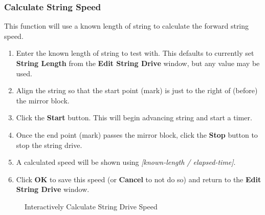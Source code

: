 \documentclass[10pt,letterpaper,titlepage]{article}
\begin{document}
    \subsubsection{Calculate String Speed}
    This function will use a known length of string to calculate the forward string speed.
    \begin{enumerate}
        \item Enter the known length of string to test with. This defaults to currently set \textbf{String Length} from the \textbf{Edit String Drive} window, but any value may be used.
        \item Align the string so that the start point (mark) is just to the right of (before) the mirror block.
        \item Click the \textbf{Start} button. This will begin advancing string and start a timer.
        \item Once the end point (mark) passes the mirror block, click the \textbf{Stop} button to stop the string drive.
        \item A calculated speed will be shown using \textit{[known-length / elapsed-time]}.
        \item Click \textbf{OK} to save this speed (or \textbf{Cancel} to not do so) and return to the \textbf{Edit String Drive} window.
    \end{enumerate}
    
    \begin{figure}[hb]
        \centering
        \caption{Interactively Calculate String Drive Speed}
        \label{fig:string_drive_speed}
    \end{figure}
    \FloatBarrier
    \newpage
\end{document}
